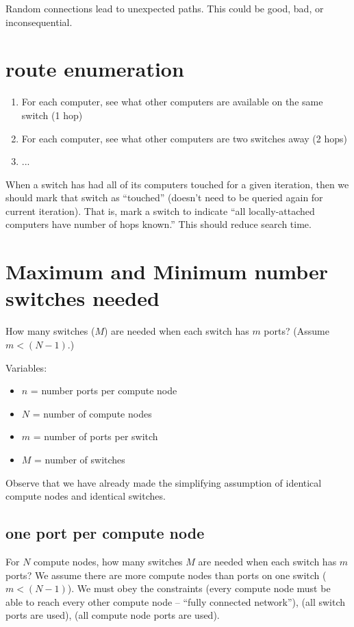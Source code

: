 \documentclass[pdftex]{article}
\begin{document}
Random connections lead to unexpected paths. This could be good, bad, or inconsequential.

\section{route enumeration}

\begin{enumerate}
 \item For each computer, see what other computers are available on the same switch (1 hop)
 \item For each computer, see what other computers are two switches away (2 hops)
 \item ...
\end{enumerate}
When a switch has had all of its computers touched for a given iteration, then we should mark that switch as ``touched'' (doesn't need to be queried again for current iteration). That is, mark a switch to indicate ``all locally-attached computers have number of hops known.'' This should reduce search time.

\section{Maximum and Minimum number switches needed}
How many switches ($M$) are needed when each switch has $m$ ports? (Assume $m<(N-1)$.)

Variables: 
\begin{itemize}
 \item $n$ = number ports per compute node
 \item $N$ = number of compute nodes
\item $m$ = number of ports per switch
 \item $M$ = number of switches
\end{itemize}
Observe that we have already made the simplifying assumption of identical compute nodes and identical switches.

\subsection{one port per compute node}
For $N$ compute nodes, how many switches $M$ are needed when each switch has $m$ ports? We assume there are more compute nodes than ports on one switch ($m<(N-1)$). We must obey the constraints (every compute node must be able to reach every other compute node -- ``fully connected network''), (all switch ports are used), (all compute node ports are used).
\end{document}
